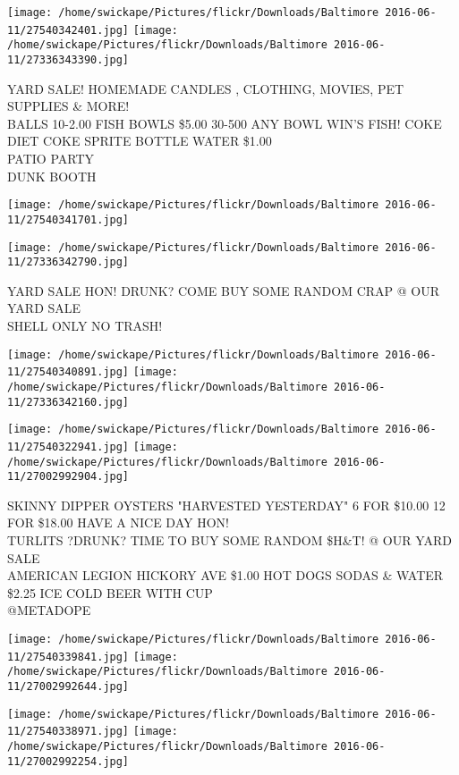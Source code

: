 \documentclass[10pt,letterpaper]{article}
\begin{document}
\texttt{[image: /home/swickape/Pictures/flickr/Downloads/Baltimore 2016-06-11/27540342401.jpg]}
\texttt{[image: /home/swickape/Pictures/flickr/Downloads/Baltimore 2016-06-11/27336343390.jpg]}

YARD SALE! HOMEMADE CANDLES , CLOTHING, MOVIES, PET SUPPLIES \& MORE!\\
BALLS 10{-}2.00 FISH BOWLS \$5.00 30{-}500 ANY BOWL WIN'S FISH!  COKE DIET COKE SPRITE BOTTLE WATER \$1.00\\
PATIO PARTY\\
DUNK BOOTH\\
\pagebreak

\texttt{[image: /home/swickape/Pictures/flickr/Downloads/Baltimore 2016-06-11/27540341701.jpg]}

\vspace{0.25in}
\texttt{[image: /home/swickape/Pictures/flickr/Downloads/Baltimore 2016-06-11/27336342790.jpg]}

YARD SALE HON!  DRUNK?  COME BUY SOME RANDOM CRAP @ OUR YARD SALE\\
SHELL ONLY NO TRASH!\\
\pagebreak

\texttt{[image: /home/swickape/Pictures/flickr/Downloads/Baltimore 2016-06-11/27540340891.jpg]}
\texttt{[image: /home/swickape/Pictures/flickr/Downloads/Baltimore 2016-06-11/27336342160.jpg]}

\texttt{[image: /home/swickape/Pictures/flickr/Downloads/Baltimore 2016-06-11/27540322941.jpg]}
\texttt{[image: /home/swickape/Pictures/flickr/Downloads/Baltimore 2016-06-11/27002992904.jpg]}

SKINNY DIPPER OYSTERS "HARVESTED YESTERDAY" 6 FOR \$10.00 12 FOR \$18.00 HAVE A NICE DAY HON!\\
TURLITS ?DRUNK? TIME TO BUY SOME RANDOM \$H\&T! @ OUR YARD SALE\\
AMERICAN LEGION HICKORY AVE \$1.00 HOT DOGS SODAS \& WATER \$2.25 ICE COLD BEER WITH CUP\\
@METADOPE\\
\pagebreak

\texttt{[image: /home/swickape/Pictures/flickr/Downloads/Baltimore 2016-06-11/27540339841.jpg]}
\texttt{[image: /home/swickape/Pictures/flickr/Downloads/Baltimore 2016-06-11/27002992644.jpg]}

\texttt{[image: /home/swickape/Pictures/flickr/Downloads/Baltimore 2016-06-11/27540338971.jpg]}
\texttt{[image: /home/swickape/Pictures/flickr/Downloads/Baltimore 2016-06-11/27002992254.jpg]}
\end{document}
